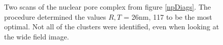 \documentclass[11pt]{article}
\begin{document}
\begin{figure}[t!]
	\centering
	\qquad
	\caption{Two scans of the nuclear pore complex from figure \ref{npDiags}. The procedure determined the values $R,T$ = 26nm, 117 to be the most optimal. Not all of the clusters were identified, even when looking at the wide field image.  }%
	\label{npClusters}
\end{figure}


\end{document}
